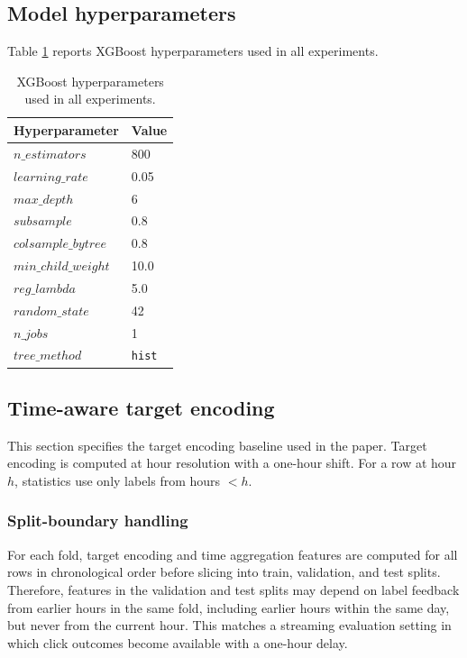 \subsection*{Model hyperparameters}
Table \ref{tab:xgb_params} reports XGBoost hyperparameters used in all experiments.

\begin{table}[t]
  \centering
  \begin{tabular}{ll}
    \toprule
    Hyperparameter & Value \\
    \midrule
    $n\_estimators$ & 800 \\
    $learning\_rate$ & 0.05 \\
    $max\_depth$ & 6 \\
    $subsample$ & 0.8 \\
    $colsample\_bytree$ & 0.8 \\
    $min\_child\_weight$ & 10.0 \\
    $reg\_lambda$ & 5.0 \\
    $random\_state$ & 42 \\
    $n\_jobs$ & 1 \\
    $tree\_method$ & \texttt{hist} \\
    \bottomrule
  \end{tabular}
  \caption{XGBoost hyperparameters used in all experiments.}
  \label{tab:xgb_params}
\end{table}

\subsection{Time-aware target encoding}
\label{sec:appendix_te_details}
This section specifies the target encoding baseline used in the paper.
Target encoding is computed at hour resolution with a one-hour shift.
For a row at hour $h$, statistics use only labels from hours $< h$.

\subsubsection*{Split-boundary handling}
For each fold, target encoding and time aggregation features are computed for all rows in chronological order before slicing into train, validation, and test splits.
Therefore, features in the validation and test splits may depend on label feedback from earlier hours in the same fold, including earlier hours within the same day, but never from the current hour.
This matches a streaming evaluation setting in which click outcomes become available with a one-hour delay.

